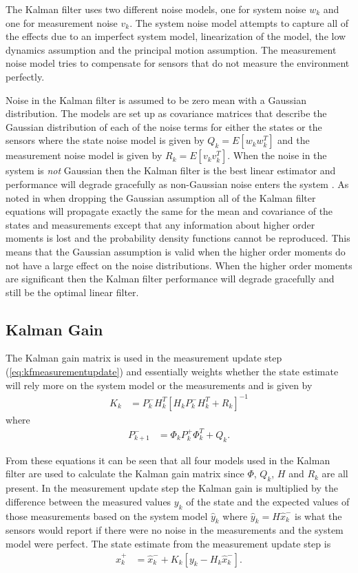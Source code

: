 The Kalman filter uses two different noise models, one for system noise $w_k$ and one for measurement noise $v_k$. The system noise model attempts to capture all of the effects due to an imperfect system model, linearization of the model, the low dynamics assumption and the principal motion assumption. The measurement noise model tries to compensate for sensors that do not measure the environment perfectly.

Noise in the Kalman filter is assumed to be zero mean with a Gaussian distribution. The models are set up as covariance matrices that describe the Gaussian distribution of each of the noise terms for either the states or the sensors where the state noise model is given by $Q_k = E[w_kw_k^T]$ and the measurement noise model is given by $R_k = E[v_kv_k^T]$. When the noise in the system is \textit{not} Gaussian then the Kalman filter is the best linear estimator and performance will degrade gracefully as non-Gaussian noise enters the system \cite{Simon10}. As noted in \cite{AndersonMoore79} when dropping the Gaussian assumption all of the Kalman filter equations will propagate exactly the same for the mean and covariance of the states and measurements except that any information about higher order moments is lost and the probability density functions cannot be reproduced. This means that the Gaussian assumption is valid when the higher order moments do not have a large effect on the noise distributions. When the higher order moments are significant then the Kalman filter performance will degrade gracefully and still be the optimal linear filter.

\subsection{Kalman Gain}
\label{kfKalmanGain}
The Kalman gain matrix is used in the measurement update step (\ref{eq:kfmeasurementupdate}) and essentially weights whether the state estimate will rely more on the system model or the measurements and is given by
\begin{align*}
K_k &= P_k^-H_k^T\left[H_kP_k^-H_k^T + R_k\right]^{-1}
\end{align*}
where
\begin{align*}
P_{k+1}^- &= \Phi_kP_k^+\Phi_k^T + Q_k.
\end{align*}

From these equations it can be seen that all four models used in the Kalman filter are used to calculate the Kalman gain matrix since $\Phi$, $Q_k$, $H$ and $R_k$ are all present. In the measurement update step the Kalman gain is multiplied by the difference between the measured values $y_k$ of the state and the expected values of those measurements based on the system model $\hat{y}_k$ where $\hat{y}_k = H\hat{x}_k^-$ is what the sensors would report if there were no noise in the measurements and the system model were perfect. The state estimate from the measurement update step is
\begin{align*}
\hat{x}_k^+ &= \hat{x}_k^- + K_k\left[y_k - H_k\hat{x}_k^-\right].
\end{align*}

